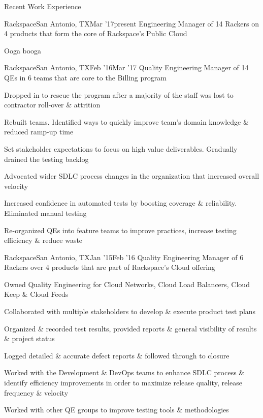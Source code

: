 \documentclass{resume} %
\begin{document}
\begin{rSection}{Recent Work Experience}

\begin{rSubsection}{Rackspace}{San Antonio, TX}{Mar '17}{present}
{Engineering Manager of 14 Rackers on 4 products that form the core of Rackspace's Public Cloud}
  
\item Ooga booga
  
\end{rSubsection}
  
\begin{rSubsection}{Rackspace}{San Antonio, TX}{Feb '16}{Mar '17}
{Quality Engineering Manager of 14 QEs in 6 teams that are core to the Billing program}
  
\item Dropped in to rescue the program after a majority of the staff was lost to contractor roll-over \& attrition
\item Rebuilt teams. Identified ways to quickly improve team's domain knowledge \& reduced ramp-up time
\item Set stakeholder expectations to focus on high value deliverables. Gradually drained the testing backlog
\item Advocated wider SDLC process changes in the organization that increased overall velocity
\item Increased confidence in automated tests by boosting coverage \& reliability. Eliminated manual testing
\item Re-organized QEs into feature teams to improve practices, increase testing efficiency \& reduce waste
  
\end{rSubsection}
    
\begin{rSubsection}{Rackspace}{San Antonio, TX}{Jan '15}{Feb '16}
{Quality Engineering Manager of 6 Rackers over 4 products that are part of Rackspace's Cloud offering}

\item Owned Quality Engineering for Cloud Networks, Cloud Load Balancers, Cloud Keep \& Cloud Feeds
\item Collaborated with multiple stakeholders to develop \& execute product test plans
\item Organized \& recorded test results, provided reports \& general visibility of results \& project status
\item Logged detailed \& accurate defect reports \& followed through to closure
\item Worked with the Development \& DevOps teams to enhance SDLC process \& identify efficiency improvements in order to maximize release quality, release frequency \& velocity
\item Worked with other QE groups to improve testing tools \& methodologies


\end{rSubsection}
\end{rSection}
\end{document}
